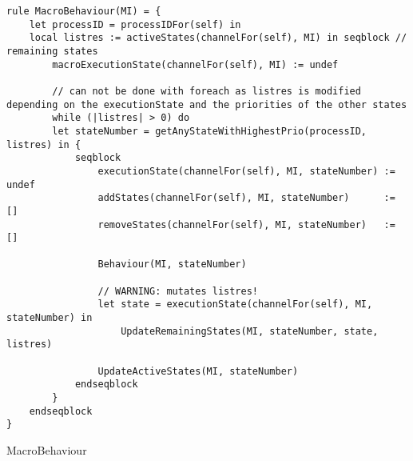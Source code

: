 \begin{listing}[H]
\begin{verbatim}
rule MacroBehaviour(MI) = {
    let processID = processIDFor(self) in
    local listres := activeStates(channelFor(self), MI) in seqblock // remaining states
        macroExecutionState(channelFor(self), MI) := undef

        // can not be done with foreach as listres is modified depending on the executionState and the priorities of the other states
        while (|listres| > 0) do
        let stateNumber = getAnyStateWithHighestPrio(processID, listres) in {
            seqblock
                executionState(channelFor(self), MI, stateNumber) := undef
                addStates(channelFor(self), MI, stateNumber)      := []
                removeStates(channelFor(self), MI, stateNumber)   := []

                Behaviour(MI, stateNumber)

                // WARNING: mutates listres!
                let state = executionState(channelFor(self), MI, stateNumber) in
                    UpdateRemainingStates(MI, stateNumber, state, listres)

                UpdateActiveStates(MI, stateNumber)
            endseqblock
        }
    endseqblock
}
\end{verbatim}
\caption{MacroBehaviour}
\label{lst:asm:MacroBehaviour}
\end{listing}




